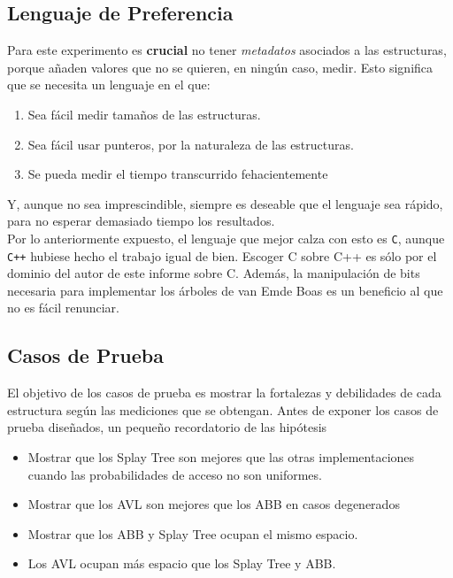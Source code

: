 \documentclass[12pt,letterpaper]{report}
\begin{document}
\subsection{Lenguaje de Preferencia}
\label{subsec:lenguaje}
Para este experimento es \textbf{crucial} no tener \emph{metadatos} asociados a las estructuras, porque añaden valores que no se quieren, en ningún caso, medir. Esto significa que se necesita un lenguaje en el que:
\begin{enumerate}
\item Sea fácil medir tamaños de las estructuras.
\item Sea fácil usar punteros, por la naturaleza de las estructuras.
\item Se pueda medir el tiempo transcurrido fehacientemente
\end{enumerate}

Y, aunque no sea imprescindible, siempre es deseable que el lenguaje sea rápido, para no esperar demasiado tiempo los resultados.\\

Por lo anteriormente expuesto, el lenguaje que mejor calza con esto es \texttt{C}, aunque \texttt{C++} hubiese hecho el trabajo igual de bien. Escoger C sobre C++ es sólo por el dominio del autor de este informe sobre C. Además, la manipulación de bits necesaria para implementar los árboles de van Emde Boas es un beneficio al que no es fácil renunciar.


\subsection{Casos de Prueba}
\label{subsec:casos_prueba}
El objetivo de los casos de prueba es mostrar la fortalezas y debilidades de cada estructura según las mediciones que se obtengan. Antes de exponer los casos de prueba diseñados, un pequeño recordatorio de las hipótesis

\begin{itemize}
\item Mostrar que los Splay Tree son mejores que las otras implementaciones cuando las probabilidades de acceso no son uniformes.
\item Mostrar que los AVL son mejores que los ABB en casos degenerados
\item Mostrar que los ABB y Splay Tree ocupan el mismo espacio.
\item Los AVL ocupan más espacio que los Splay Tree y ABB.
\end{itemize}
\end{document}
